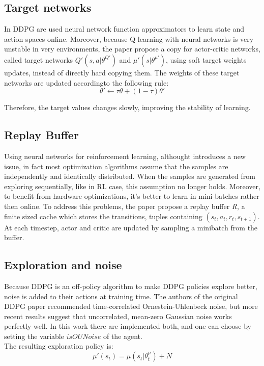 \documentclass[12pt]{report}
\begin{document}
\subsection{Target networks}
In DDPG are used neural network function approximators to learn state and action spaces online. Moreover, because Q learning with neural networks is very unstable in very environments, the paper propose a copy for actor-critic networks, called target networks $Q'(s,a|\theta^{Q'})$ and $\mu'(s|\theta^{\mu'})$, using soft target weights updates, instead of directly hard copying them. The weights of these target networks are updated accordingto the following rule: 
\[
	\theta' \leftarrow \tau \theta + (1-\tau)\theta'
\]

Therefore, the target values changes slowly, improving the stability of learning.

\subsection{Replay Buffer}
Using neural networks for reinforcement learning, althought introduces a new issue, in fact most optimization algorithms assume that the samples are independently and identically distributed. When the samples are generated from exploring sequentially, like in RL case, this assumption no longer holds. Moreover, to benefit from hardware optimizations, it's better to learn in mini-batches rather then online. To address this problems, the paper propose a replay buffer \textit{R}, a finite sized cache which stores the transitions, tuples containing $(s_t, a_t, r_t, s_{t+1})$. At each timestep, actor and critic are updated by sampling a minibatch from the buffer.

\subsection{Exploration and noise}
Because DDPG is an off-policy algorithm to make DDPG policies explore better, noise is added to their actions at training time. The authors of the original DDPG paper recommended time-correlated Ornestein-Uhlenbeck noise, but more recent results suggest that uncorrelated, mean-zero Gaussian noise works perfectly well. In this work there are implemented both, and one can choose by setting the variable $isOUNoise$ of the agent.\\
The resulting exploration policy is:
\[
	\mu'(s_t) = \mu(s_t|\theta_t^\mu) + N
\]
\end{document}
